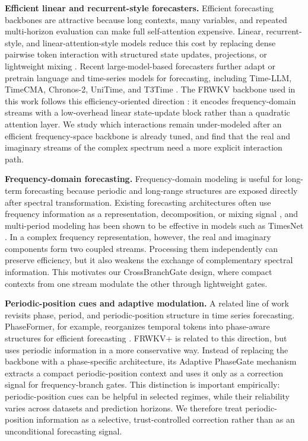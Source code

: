 \documentclass[a4paper,fleqn]{cas-sc}
\begin{document}
\textbf{Efficient linear and recurrent-style forecasters.}
Efficient forecasting backbones are attractive because long contexts, many variables, and repeated multi-horizon evaluation can make full self-attention expensive. Linear, recurrent-style, and linear-attention-style models reduce this cost by replacing dense pairwise token interaction with structured state updates, projections, or lightweight mixing \cite{peng2023rwkv,gu2023mamba,hou2024rwkvts,wang2025smamba}. Recent large-model-based forecasters further adapt or pretrain language and time-series models for forecasting, including Time-LLM, TimeCMA, Chronos-2, UniTime, and T3Time \cite{jin2024timellm,liu2025timecma,ansari2025chronos2,liu2024unitime,chowdhury2025t3time}. The FRWKV backbone used in this work follows this efficiency-oriented direction \cite{yang2025frwkv}: it encodes frequency-domain streams with a low-overhead linear state-update block rather than a quadratic attention layer. We study which interactions remain under-modeled after an efficient frequency-space backbone is already tuned, and find that the real and imaginary streams of the complex spectrum need a more explicit interaction path.

\textbf{Frequency-domain forecasting.}
Frequency-domain modeling is useful for long-term forecasting because periodic and long-range structures are exposed directly after spectral transformation. Existing forecasting architectures often use frequency information as a representation, decomposition, or mixing signal \cite{zhou2022fedformer,yi2023frets}, and multi-period modeling has been shown to be effective in models such as TimesNet \cite{wu2023timesnet}. In a complex frequency representation, however, the real and imaginary components form two coupled streams. Processing them independently can preserve efficiency, but it also weakens the exchange of complementary spectral information. This motivates our CrossBranchGate design, where compact contexts from one stream modulate the other through lightweight gates.

\textbf{Periodic-position cues and adaptive modulation.}
A related line of work revisits phase, period, and periodic-position structure in time series forecasting. PhaseFormer, for example, reorganizes temporal tokens into phase-aware structures for efficient forecasting \cite{niu2026phaseformer}. FRWKV+ is related to this direction, but uses periodic information in a more conservative way. Instead of replacing the backbone with a phase-specific architecture, its Adaptive PhaseGate mechanism extracts a compact periodic-position context and uses it only as a correction signal for frequency-branch gates. This distinction is important empirically: periodic-position cues can be helpful in selected regimes, while their reliability varies across datasets and prediction horizons. We therefore treat periodic-position information as a selective, trust-controlled correction rather than as an unconditional forecasting signal.
\end{document}
